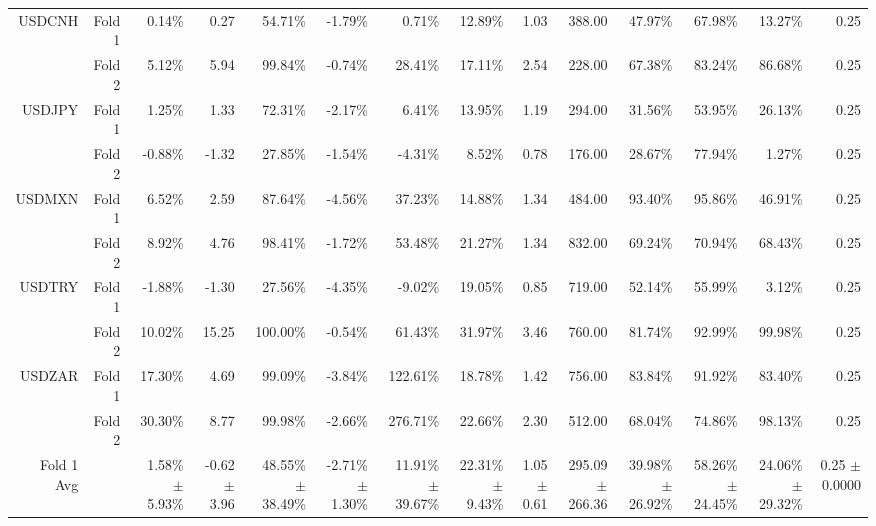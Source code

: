 \begin{table}[H]
{\begin{tabular}{rrrrrrrrrrrrrr}
USDCNH & Fold 1 & 0.14\% & 0.27 & 54.71\% & -1.79\% & 0.71\% & 12.89\% & 1.03 & 388.00 & 47.97\% & 67.98\% & 13.27\% & 0.25 \\
 & Fold 2 & 5.12\% & 5.94 & 99.84\% & -0.74\% & 28.41\% & 17.11\% & 2.54 & 228.00 & 67.38\% & 83.24\% & 86.68\% & 0.25 \\
USDJPY & Fold 1 & 1.25\% & 1.33 & 72.31\% & -2.17\% & 6.41\% & 13.95\% & 1.19 & 294.00 & 31.56\% & 53.95\% & 26.13\% & 0.25 \\
 & Fold 2 & -0.88\% & -1.32 & 27.85\% & -1.54\% & -4.31\% & 8.52\% & 0.78 & 176.00 & 28.67\% & 77.94\% & 1.27\% & 0.25 \\
USDMXN & Fold 1 & 6.52\% & 2.59 & 87.64\% & -4.56\% & 37.23\% & 14.88\% & 1.34 & 484.00 & 93.40\% & 95.86\% & 46.91\% & 0.25 \\
 & Fold 2 & 8.92\% & 4.76 & 98.41\% & -1.72\% & 53.48\% & 21.27\% & 1.34 & 832.00 & 69.24\% & 70.94\% & 68.43\% & 0.25 \\
USDTRY & Fold 1 & -1.88\% & -1.30 & 27.56\% & -4.35\% & -9.02\% & 19.05\% & 0.85 & 719.00 & 52.14\% & 55.99\% & 3.12\% & 0.25 \\
 & Fold 2 & 10.02\% & 15.25 & 100.00\% & -0.54\% & 61.43\% & 31.97\% & 3.46 & 760.00 & 81.74\% & 92.99\% & 99.98\% & 0.25 \\
USDZAR & Fold 1 & 17.30\% & 4.69 & 99.09\% & -3.84\% & 122.61\% & 18.78\% & 1.42 & 756.00 & 83.84\% & 91.92\% & 83.40\% & 0.25 \\
 & Fold 2 & 30.30\% & 8.77 & 99.98\% & -2.66\% & 276.71\% & 22.66\% & 2.30 & 512.00 & 68.04\% & 74.86\% & 98.13\% & 0.25 \\
\midrule
\midrule
Fold 1 Avg &  & \shortstack{1.58\% \\ $\pm$ 5.93\%} & \shortstack{-0.62 \\ $\pm$ 3.96} & \shortstack{48.55\% \\ $\pm$ 38.49\%} & \shortstack{-2.71\% \\ $\pm$ 1.30\%} & \shortstack{11.91\% \\ $\pm$ 39.67\%} & \shortstack{22.31\% \\ $\pm$ 9.43\%} & \shortstack{1.05 \\ $\pm$ 0.61} & \shortstack{295.09 \\ $\pm$ 266.36} & \shortstack{39.98\% \\ $\pm$ 26.92\%} & \shortstack{58.26\% \\ $\pm$ 24.45\%} & \shortstack{24.06\% \\ $\pm$ 29.32\%} & \shortstack{0.25 \\ $\pm$ 0.0000} \\

\end{tabular}}
\end{table}
